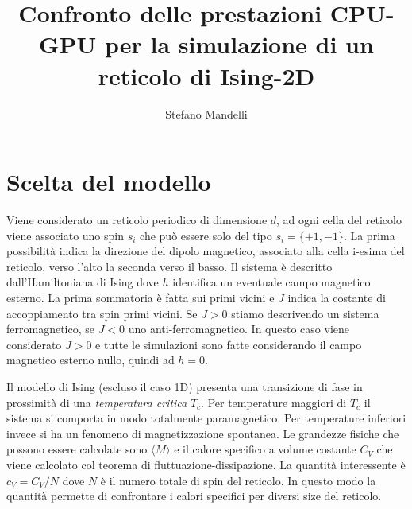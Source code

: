 \documentclass[a4paper,12pt]{article}
\begin{document}
\author{Stefano Mandelli}
\title{\bf \Huge Confronto delle prestazioni CPU-GPU per la simulazione di un reticolo di Ising-2D}
\date{}
\maketitle
\section{Scelta del modello}

Viene considerato un reticolo periodico di dimensione $d$, ad ogni cella del reticolo viene associato uno spin $s_i$ che può essere solo del tipo $s_i=\{+1, -1\}$.
La prima possibilità indica la direzione del dipolo magnetico, associato alla cella
i-esima del reticolo, verso l'alto la seconda verso il basso. Il sistema è descritto dall'Hamiltoniana di Ising
dove $h$ identifica un eventuale campo magnetico esterno. La prima sommatoria è fatta sui primi vicini e $J$ indica la costante di accoppiamento tra spin primi vicini.
Se $J>0$ stiamo descrivendo un sistema ferromagnetico, se $J<0$ uno anti-ferromagnetico. In questo caso viene considerato $J>0$ e tutte le simulazioni sono fatte considerando
il campo magnetico esterno nullo, quindi ad $h=0$.

Il modello di Ising (escluso il caso 1D) presenta una transizione di fase in prossimità di una \textit{temperatura critica} $T_c$. Per temperature maggiori di $T_c$ il sistema si comporta
in modo totalmente paramagnetico. Per temperature inferiori invece si ha un fenomeno di magnetizzazione spontanea.
Le grandezze fisiche che possono essere calcolate sono $\langle M \rangle$ e il calore specifico a volume costante $C_V$ che viene calcolato col teorema di fluttuazione-dissipazione.
La quantità interessente è $c_V = C_V / N$ dove $N$ è il numero totale di spin del reticolo. In questo modo la quantità
permette di confrontare i calori specifici per diversi size del reticolo.
\end{document}
